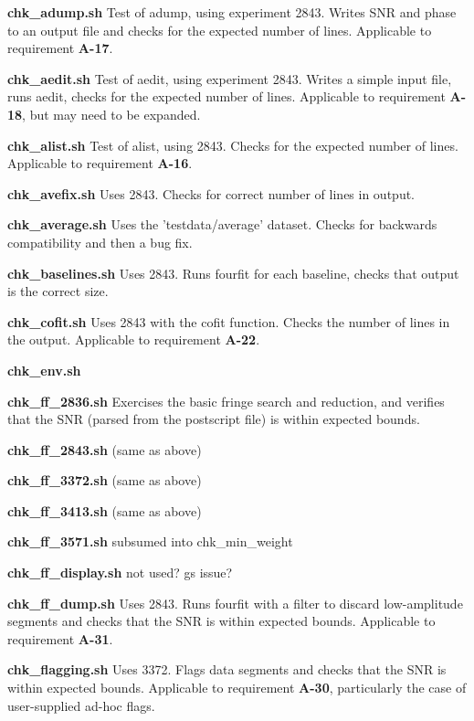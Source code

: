 \begin{description}

\item{\textbf{chk\_adump.sh}} Test of adump, using experiment 2843. Writes SNR and phase to an output file and checks for the expected number of lines. Applicable to requirement \textbf{A-17}.
\item{\textbf{chk\_aedit.sh}} Test of aedit, using experiment 2843. Writes a simple input file, runs aedit, checks for the expected number of lines. Applicable to requirement \textbf{A-18}, but may need to be expanded.
\item{\textbf{chk\_alist.sh}} Test of alist, using 2843. Checks for the expected number of lines. Applicable to requirement \textbf{A-16}.
\item{\textbf{chk\_avefix.sh}} Uses 2843. Checks for correct number of lines in output.
\item{\textbf{chk\_average.sh}} Uses the 'testdata/average' dataset. Checks for backwards compatibility and then a bug fix. %
\item{\textbf{chk\_baselines.sh}} Uses 2843. Runs fourfit for each baseline, checks that output is the correct size.
\item{\textbf{chk\_cofit.sh}} Uses 2843 with the cofit function. Checks the number of lines in the output. Applicable to requirement \textbf{A-22}.
\item{\textbf{chk\_env.sh}} 
\item{\textbf{chk\_ff\_2836.sh}} Exercises the basic fringe search and reduction, and verifies that the SNR (parsed from the postscript file) is within expected bounds.
\item{\textbf{chk\_ff\_2843.sh}} (same as above)
\item{\textbf{chk\_ff\_3372.sh}} (same as above)
\item{\textbf{chk\_ff\_3413.sh}} (same as above)
\item{\textbf{chk\_ff\_3571.sh}} subsumed into chk\_min\_weight
\item{\textbf{chk\_ff\_display.sh}} not used? gs issue?
\item{\textbf{chk\_ff\_dump.sh}} Uses 2843. Runs fourfit with a filter to discard low-amplitude segments and checks that the SNR is within expected bounds. Applicable to requirement \textbf{A-31}.
\item{\textbf{chk\_flagging.sh}} Uses 3372. Flags data segments and checks that the SNR is within expected bounds. Applicable to requirement \textbf{A-30}, particularly the case of user-supplied ad-hoc flags.

\end{description}
